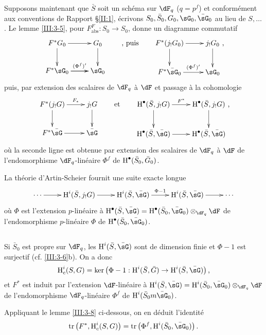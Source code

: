 Supposons maintenant que $\bar S$ soit un schéma sur $\dF_q$ ($q=p^f$) et 
conformément aux conventions de Rapport \S\ref{II:1}, écrivons 
$S_0,\bar S_0,G_0,\sG_0,\bar\sG_0$ au lieu de $S,\dots$. Le lemme 
\ref{III:3-5}, pour $F_\text{abs}^F:S_0\to S_0$, donne un diagramme commutatif 
\[\xymatrix{
  F^* G_0 \ar[r] \ar[d] 
    & G_0 \ar[d] \\
  F^*\sG_0 \ar[r]^-{(\Phi^f)'} \ar[r] 
    & \sG_0 
}\qquad\text{, puis}\qquad 
\xymatrix{
  F^*(j_! G_0) \ar[r] \ar[d] 
    & j_!G_0 \ar[d] \\
  F^*\bar\sG_0 \ar[r]^-{(\Phi^f)'}
    & \sG_0
}\text{,}
\]
puis, par extension des scalaires de $\dF_q$ à $\dF$ et passage à la 
cohomologie 
\[\xymatrix{
  F^*(j_! G) \ar[r]^-{F_*} \ar[d] 
    & j_!G \ar[d] \\
  F^*\bar\sG \ar[r]
    & \bar\sG
}\qquad\text{et}\qquad 
\xymatrix{
  \h^\bullet(\bar S,j_! G) \ar[r]^-{F^*} \ar[d] 
    & \h^\bullet(\bar S,j_!G) \ar[d] \\
  \h^\bullet(\bar S,\bar\sG) \ar[r]
    & \h^\bullet(\bar S,\bar\sG)
}\text{,}
\]
où la seconde ligne est obtenue par extension des scalaires de $\dF_q$ à 
$\dF$ de l'endomorphisme $\dF_q$-linéaire $\Phi^f$ de 
$\operatorname{H}^\bullet(\bar S_0,\bar G_0)$. 

La théorie d'Artin-Scheier fournit une suite exacte longue 
\[\xymatrix{
  \cdots \ar[r]
    & \h^i(\bar S,j_! G) \ar[r]
    & \h^i(\bar S,\bar\sG) \ar[r]^-{\Phi-1}
    & \h^i(\bar S,\bar\sG) \ar[r]
    & \cdots
}\]
où $\Phi$ est l'extension $p$-linéaire à 
$\h^\bullet(\bar S,\bar \sG)= \h^\bullet(\bar S_0,\bar\sG_0)\otimes_{\dF_q}\dF$ 
de l'endomorphisme $p$-linéaire $\Phi$ de $\h^\bullet(\bar S_0,\bar\sG_0)$. 





\subsection{}\label{III:3-7}

Si $\bar S_0$ est propre sur $\dF_q$, les $\h^i(\bar S,\bar\sG)$ sont de 
dimension finie et $\Phi-1$ est surjectif (cf. \ref{III:3-6}b). On a donc 
\[
  \h_c^i(S,G) = \ker\left(\Phi-1 : \h^i(\bar S,\bar G) \to \h^i(\bar S,\bar\sG)\right) \text{,}
\]
et $F^*$ est induit par l'extension $\dF$-linéaire à 
$\h^i(\bar S,\bar\sG) = \h^i(\bar S_0,\bar\sG_0)\otimes_{\dF_q}\dF$ de 
l'endomorphisme $\dF_q$-linéaire $\Phi^f$ de $\h^i(\bar S_0m\bar\sG_0)$. 

Appliquant le lemme \ref{III:3-8} ci-dessous, on en déduit l'identité 
\begin{equation}\label{III:eq:3-7-1}
  \tr\left(F^*,\h_c^i(S,G)\right) = \tr\left(\Phi^f,\h^i(\bar S_0,\bar\sG_0)\right) \text{.}
\end{equation}





